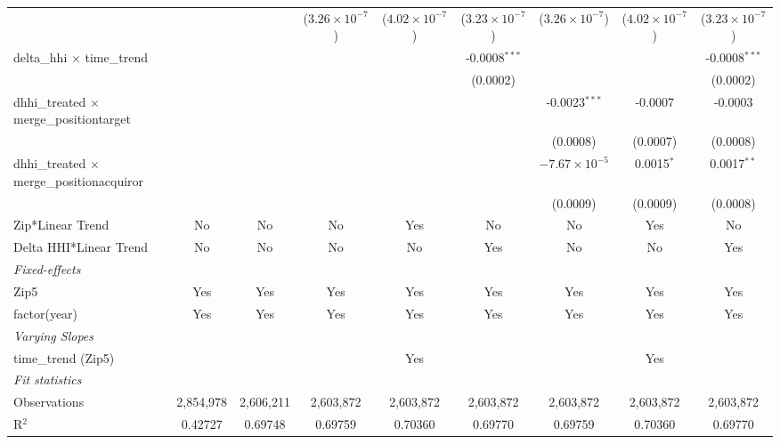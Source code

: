 \begin{table}[H]
{\begin{tabular}{lcccccccc}
   &   &    & ($3.26\times 10^{-7}$) & ($4.02\times 10^{-7}$) & ($3.23\times 10^{-7}$) & ($3.26\times 10^{-7}$) & ($4.02\times 10^{-7}$) & ($3.23\times 10^{-7}$)\\ 

 delta\_hhi $\times $ time\_trend&   &    &    &    & -0.0008$^{***}$ &    &    & -0.0008$^{***}$\\ 

   &   &    &    &    & (0.0002) &    &    & (0.0002)\\ 

 dhhi\_treated $\times $ merge\_positiontarget&   &    &    &    &    & -0.0023$^{***}$ & -0.0007 & -0.0003\\ 

   &   &    &    &    &    & (0.0008) & (0.0007) & (0.0008)\\ 

 dhhi\_treated $\times $ merge\_positionacquiror&   &    &    &    &    & $-7.67\times 10^{-5}$ & 0.0015$^{*}$ & 0.0017$^{**}$\\ 

   &   &    &    &    &    & (0.0009) & (0.0009) & (0.0008)\\ 

 Zip*Linear Trend & No & No & No & Yes & No & No & Yes & No\\ 

 Delta HHI*Linear Trend & No & No & No & No & Yes & No & No & Yes\\ 

 \midrule \emph{Fixed-effects}&   &   &   &   &   &   &   &  \\ 

 Zip5 & Yes & Yes & Yes & Yes & Yes & Yes & Yes & Yes\\ 

 factor(year) & Yes & Yes & Yes & Yes & Yes & Yes & Yes & Yes\\ 

 \midrule \emph{Varying Slopes}&   &   &   &   &   &   &   &  \\ 

 time\_trend (Zip5) &  &  &  & Yes &  &  & Yes & \\ 

 \midrule \emph{Fit statistics}&  & & & & & & & \\ 

 Observations & 2,854,978&2,606,211&2,603,872&2,603,872&2,603,872&2,603,872&2,603,872&2,603,872\\ 

 R$^2$ & 0.42727&0.69748&0.69759&0.70360&0.69770&0.69759&0.70360&0.69770\\ 


\end{tabular}}
\end{table}
